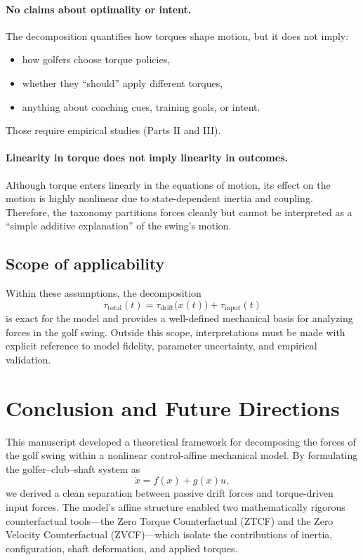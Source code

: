 \documentclass[12pt]{article}
\newcommand{\xd}{\dot{x}}
\begin{document}
\paragraph{No claims about optimality or intent.}
The decomposition quantifies how torques shape motion, but it does not imply:
\begin{itemize}
  \item how golfers choose torque policies,
  \item whether they “should” apply different torques,
  \item anything about coaching cues, training goals, or intent.
\end{itemize}
Those require empirical studies (Parts II and III).

\paragraph{Linearity in torque does not imply linearity in outcomes.}
Although torque enters linearly in the equations of motion, its effect on the motion is highly nonlinear due to state-dependent inertia and coupling. Therefore, the taxonomy partitions forces cleanly but cannot be interpreted as a ``simple additive explanation'' of the swing’s motion.

\subsection{Scope of applicability}

Within these assumptions, the decomposition
\[
  \tau_{\text{total}}(t) = \tau_{\text{drift}}\big(x(t)\big) + \tau_{\text{input}}(t)
\]
is exact for the model and provides a well-defined mechanical basis for analyzing forces in the golf swing. Outside this scope, interpretations must be made with explicit reference to model fidelity, parameter uncertainty, and empirical validation.

\section{Conclusion and Future Directions}
\label{sec:conclusion}

This manuscript developed a theoretical framework for decomposing the forces of the golf swing within a nonlinear control-affine mechanical model. By formulating the golfer--club--shaft system as
\[
  \xd = f(x) + g(x)u,
\]
we derived a clean separation between passive drift forces and torque-driven input forces. The model’s affine structure enabled two mathematically rigorous counterfactual tools—the Zero Torque Counterfactual (ZTCF) and the Zero Velocity Counterfactual (ZVCF)—which isolate the contributions of inertia, configuration, shaft deformation, and applied torques.
\end{document}
